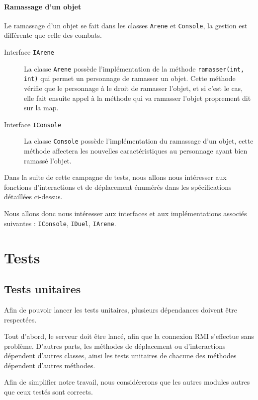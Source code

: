 \documentclass[12pt,a4paper,openany]{book}
\begin{document}
		\subsubsection{Ramassage d'un objet}
		Le ramassage d'un objet se fait dans les classes \texttt{Arene} et \texttt{Console}, la gestion est différente que celle des combats.

		\begin{description}
			\item[Interface \texttt{IArene}]La classe \texttt{Arene} possède l'implémentation de la méthode \texttt{ramasser(int, int)} qui permet un personnage de ramasser un objet.
				Cette méthode vérifie que le personnage à le droit de ramasser l'objet, et si c'est le cas, elle fait ensuite appel à la méthode qui va ramasser
				l'objet proprement dit sur la map.
			\item[Interface \texttt{IConsole}] La classe \texttt{Console} possède l'implémentation du ramassage d'un objet, cette méthode affectera les nouvelles
				caractéristiques au personnage ayant bien ramassé l'objet.
		\end{description}
		
		\begin{remarque}
			Dans la suite de cette campagne de tests, nous allons nous intéresser aux fonctions d'interactions et de déplacement énumérés dans les spécifications
			détaillées ci-dessus.

			Nous allons donc nous intéresser aux interfaces et aux implémentations associés suivantes : \texttt{IConsole}, \texttt{IDuel}, \texttt{IArene}.
		\end{remarque}
		
		\chapter{Tests}
		\section{Tests unitaires}
		Afin de pouvoir lancer les tests unitaires, plusieurs dépendances doivent être respectées.

		Tout d'abord, le serveur doit être lancé, afin que la connexion RMI s'effectue sans problème. D'autres parts, les méthodes de déplacement ou
		d'interactions dépendent d'autres classes, ainsi les tests unitaires de chacune des méthodes dépendent d'autres méthodes.

		\begin{attention}
			Afin de simplifier notre travail, nous considérerons que les autres modules autres que ceux testés sont corrects.
		\end{attention}
\end{document}

